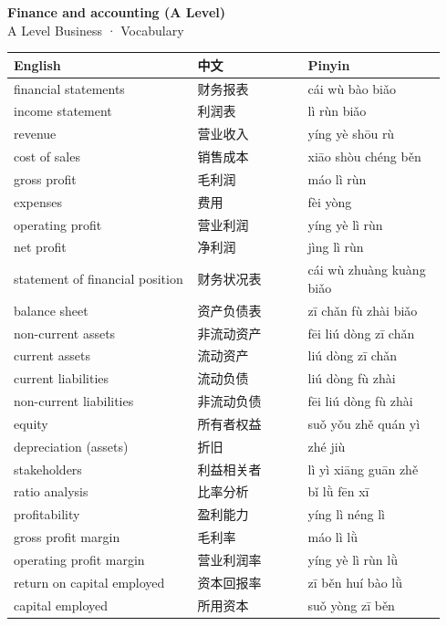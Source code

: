\documentclass[11pt]{article}
\begin{document}
\begin{center}
  {\LARGE\bfseries Finance and accounting (A Level)}\\[0.35em]
  {\large A Level Business · Vocabulary}
\end{center}
\vspace{0.6em}

\begin{longtable}{@{}p{0.40\linewidth}p{0.24\linewidth}p{0.30\linewidth}@{}}
\toprule
\textbf{English} & \textbf{中文} & \textbf{Pinyin} \\
\midrule
\endhead
\bottomrule
\endlastfoot
financial statements & 财务报表 & cái wù bào biǎo \\
income statement & 利润表 & lì rùn biǎo \\
revenue & 营业收入 & yíng yè shōu rù \\
cost of sales & 销售成本 & xiāo shòu chéng běn \\
gross profit & 毛利润 & máo lì rùn \\
expenses & 费用 & fèi yòng \\
operating profit & 营业利润 & yíng yè lì rùn \\
net profit & 净利润 & jìng lì rùn \\
statement of financial position & 财务状况表 & cái wù zhuàng kuàng biǎo \\
balance sheet & 资产负债表 & zī chǎn fù zhài biǎo \\
non-current assets & 非流动资产 & fēi liú dòng zī chǎn \\
current assets & 流动资产 & liú dòng zī chǎn \\
current liabilities & 流动负债 & liú dòng fù zhài \\
non-current liabilities & 非流动负债 & fēi liú dòng fù zhài \\
equity & 所有者权益 & suǒ yǒu zhě quán yì \\
depreciation (assets) & 折旧 & zhé jiù \\
stakeholders & 利益相关者 & lì yì xiāng guān zhě \\
ratio analysis & 比率分析 & bǐ lǜ fēn xī \\
profitability & 盈利能力 & yíng lì néng lì \\
gross profit margin & 毛利率 & máo lì lǜ \\
operating profit margin & 营业利润率 & yíng yè lì rùn lǜ \\
return on capital employed & 资本回报率 & zī běn huí bào lǜ \\
capital employed & 所用资本 & suǒ yòng zī běn \\

\end{longtable}
\end{document}
